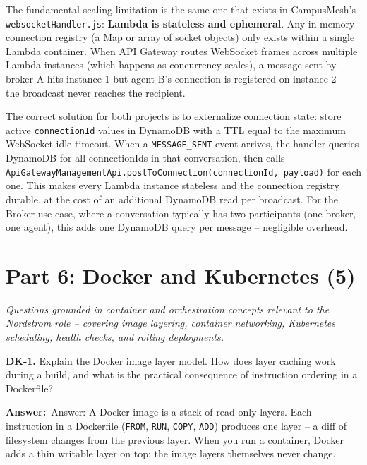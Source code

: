 \documentclass[letterpaper,10pt]{article}
\newlength{\boxwidth}
\newcommand{\answerlabel}{\noindent\textbf{\textcolor{answerblue}{Answer:}}~}
\begin{document}
The fundamental scaling limitation is the same one that exists in CampusMesh's \texttt{websocketHandler.js}: \textbf{Lambda is stateless and ephemeral}. Any in-memory connection registry (a Map or array of socket objects) only exists within a single Lambda container. When API Gateway routes WebSocket frames across multiple Lambda instances (which happens as concurrency scales), a message sent by broker A hits instance 1 but agent B's connection is registered on instance 2 -- the broadcast never reaches the recipient.

The correct solution for both projects is to externalize connection state: store active \texttt{connectionId} values in DynamoDB with a TTL equal to the maximum WebSocket idle timeout. When a \texttt{MESSAGE\_SENT} event arrives, the handler queries DynamoDB for all connectionIds in that conversation, then calls \texttt{ApiGatewayManagementApi.postToConnection(connectionId, payload)} for each one. This makes every Lambda instance stateless and the connection registry durable, at the cost of an additional DynamoDB read per broadcast. For the Broker use case, where a conversation typically has two participants (one broker, one agent), this adds one DynamoDB query per message -- negligible overhead.

\newpage

\section{Part 6: Docker and Kubernetes (5)}

\noindent\textit{Questions grounded in container and orchestration concepts relevant to the Nordstrom role -- covering image layering, container networking, Kubernetes scheduling, health checks, and rolling deployments.}
\vspace{4pt}

\colorbox{qbg}{\begin{minipage}{\boxwidth}
\textbf{DK-1.} Explain the Docker image layer model. How does layer caching work during a build, and what is the practical consequence of instruction ordering in a Dockerfile?
\end{minipage}}

\vspace{2pt}
\answerlabel{Answer:} A Docker image is a stack of read-only layers. Each instruction in a Dockerfile (\texttt{FROM}, \texttt{RUN}, \texttt{COPY}, \texttt{ADD}) produces one layer -- a diff of filesystem changes from the previous layer. When you run a container, Docker adds a thin writable layer on top; the image layers themselves never change.
\end{document}
